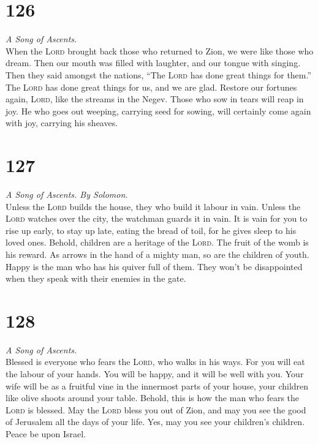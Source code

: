 \hypertarget{section-125}{%
\section{126}\label{section-125}}

\emph{A Song of Ascents.}\\
 When the \textsc{Lord} brought back those who returned to
Zion, we were like those who dream.  Then our mouth was
filled with laughter, and our tongue with singing. Then they said
amongst the nations, ``The \textsc{Lord} has done great things for
them.''  The \textsc{Lord} has done great things for us,
and we are glad.  Restore our fortunes again,
\textsc{Lord}, like the streams in the Negev.  Those who
sow in tears will reap in joy.  He who goes out weeping,
carrying seed for sowing, will certainly come again with joy, carrying
his sheaves.

\hypertarget{section-126}{%
\section{127}\label{section-126}}

\emph{A Song of Ascents. By Solomon.}\\
 Unless the \textsc{Lord} builds the house, they who build
it labour in vain. Unless the \textsc{Lord} watches over the city, the
watchman guards it in vain.  It is vain for you to rise up
early, to stay up late, eating the bread of toil, for he gives sleep to
his loved ones.  Behold, children are a heritage of the
\textsc{Lord}. The fruit of the womb is his reward.  As
arrows in the hand of a mighty man, so are the children of youth.
 Happy is the man who has his quiver full of them. They
won't be disappointed when they speak with their enemies in the gate.

\hypertarget{section-127}{%
\section{128}\label{section-127}}

\emph{A Song of Ascents.}\\
 Blessed is everyone who fears the \textsc{Lord}, who
walks in his ways.  For you will eat the labour of your
hands. You will be happy, and it will be well with you. 
Your wife will be as a fruitful vine in the innermost parts of your
house, your children like olive shoots around your table. 
Behold, this is how the man who fears the \textsc{Lord} is blessed.
 May the \textsc{Lord} bless you out of Zion, and may you
see the good of Jerusalem all the days of your life.  Yes,
may you see your children's children. Peace be upon Israel.

